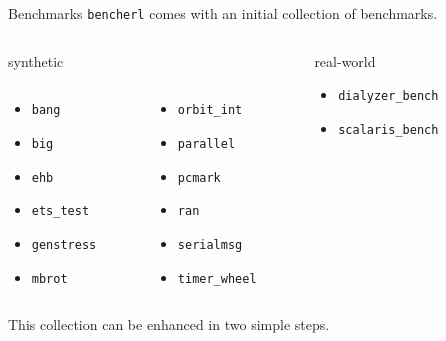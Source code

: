 \documentclass{beamer}
\begin{document}
\begin{frame}[t]{Benchmarks}
	\texttt{bencherl} comes with an initial collection of benchmarks.
    \vspace{10pt}
	\begin{columns}[t]
		\begin{column}{0.5\textwidth}
			\begin{center}
			\textcolor{burgundy}{synthetic}
			\begin{columns}
				\begin{column}{0.6\textwidth}
					\begin{itemize}
						\item[] \texttt{bang}
						\item[] \texttt{big}
						\item[] \texttt{ehb}
						\item[] \texttt{ets\_test}
						\item[] \texttt{genstress}
						\item[] \texttt{mbrot}
					\end{itemize}
				\end{column}
				\begin{column}{0.45\textwidth}
					\begin{itemize}
						\item[] \texttt{orbit\_int}
						\item[] \texttt{parallel}
						\item[] \texttt{pcmark}
						\item[] \texttt{ran}
						\item[] \texttt{serialmsg}
						\item[] \texttt{timer\_wheel}
					\end{itemize}
				\end{column}
			\end{columns}
			\end{center}	
		\end{column}
        \begin{column}{0.3\textwidth}
			\begin{center}	
			\textcolor{burgundy}{real-world}
			\begin{itemize}
				\item[] \texttt{dialyzer\_bench}
				\item[] \texttt{scalaris\_bench}
			\end{itemize}
			\end{center}
        \end{column}
	\end{columns}	
	\vspace{20pt}
	This collection can be \textcolor{burgundy}{enhanced} in two simple steps.
\end{frame}
\end{document}
